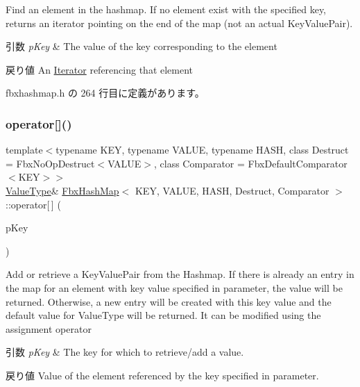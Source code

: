 Find an element in the hashmap. If no element exist with the specified key, returns an iterator pointing on the end of the map (not an actual Key\+Value\+Pair). 
\begin{DoxyParams}{引数}
{\em p\+Key} & The value of the key corresponding to the element \\
\hline
\end{DoxyParams}
\begin{DoxyReturn}{戻り値}
An \hyperlink{class_fbx_hash_map_1_1_iterator}{Iterator} referencing that element 
\end{DoxyReturn}


 fbxhashmap.\+h の 264 行目に定義があります。

\mbox{\label{class_fbx_hash_map_a15e7a23bb44c1f0cd21b3b04f84c3fa9}} 
\subsubsection{\texorpdfstring{operator[]()}{operator[]()}}
{\footnotesize\ttfamily template$<$typename K\+EY, typename V\+A\+L\+UE, typename H\+A\+SH, class Destruct = Fbx\+No\+Op\+Destruct$<$\+V\+A\+L\+U\+E$>$, class Comparator = Fbx\+Default\+Comparator$<$\+K\+E\+Y$>$$>$ \\
\hyperlink{class_fbx_hash_map_a9c4cfd0138aa9233c119403f3cc85501}{Value\+Type}\& \hyperlink{class_fbx_hash_map}{Fbx\+Hash\+Map}$<$ K\+EY, V\+A\+L\+UE, H\+A\+SH, Destruct, Comparator $>$\+::operator\mbox{[}$\,$\mbox{]} (\begin{DoxyParamCaption}\item[{const \hyperlink{class_fbx_hash_map_ab56799173b6c58b676a94370b64ddbb0}{Key\+Type} \&}]{p\+Key }\end{DoxyParamCaption})\hspace{0.3cm}{\ttfamily [inline]}}

Add or retrieve a Key\+Value\+Pair from the Hashmap. If there is already an entry in the map for an element with key value specified in parameter, the value will be returned. Otherwise, a new entry will be created with this key value and the default value for Value\+Type will be returned. It can be modified using the assignment operator 
\begin{DoxyParams}{引数}
{\em p\+Key} & The key for which to retrieve/add a value. \\
\hline
\end{DoxyParams}
\begin{DoxyReturn}{戻り値}
Value of the element referenced by the key specified in parameter. 
\end{DoxyReturn}


